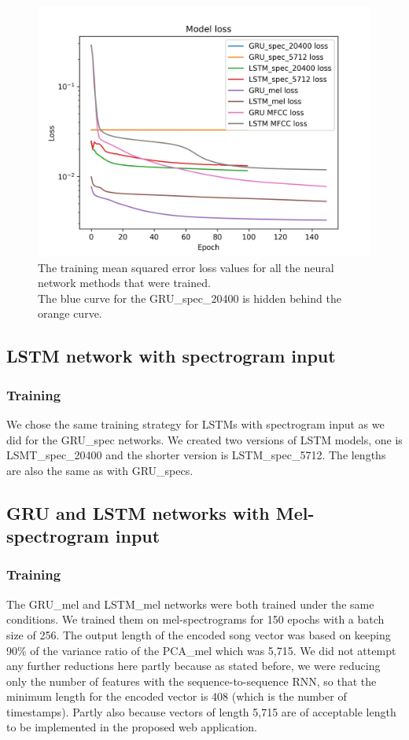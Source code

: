 \begin{figure}[h]
    \centering
	\includegraphics[width=120mm]{./img/all_training_graphs.png}
	\caption[]{The training mean squared error loss values for all the neural network methods that were trained. \\
	\tiny{The blue curve for the GRU\_spec\_20400 is hidden behind the orange curve.}}
	\label{fig:all_model_training}
\end{figure}


\subsection{LSTM network with spectrogram input}\label{ssec:LSTM_spec_experiments}

\subsubsection{Training}
We chose the same training strategy for LSTMs with spectrogram input as we did for the GRU\_spec networks. We created two versions of LSTM models, one is LSMT\_spec\_20400 and the shorter version is LSTM\_spec\_5712. The lengths are also the same as with GRU\_specs.

\subsection{GRU and LSTM networks with Mel-spectrogram input}\label{ssec:GRU_LSTM_mel_experiments}

\subsubsection{Training}
The GRU\_mel and LSTM\_mel networks were both trained under the same conditions. We trained them on mel-spectrograms for 150 epochs with a batch size of 256. The output length of the encoded song vector was based on keeping 90\% of the variance ratio of the PCA\_mel which was 5,715. We did not attempt any further reductions here partly because as stated before, we were reducing only the number of features with the sequence-to-sequence RNN, so that the minimum length for the encoded vector is 408 (which is the number of timestamps). Partly also because vectors of length 5,715 are of acceptable length to be implemented in the proposed web application.


